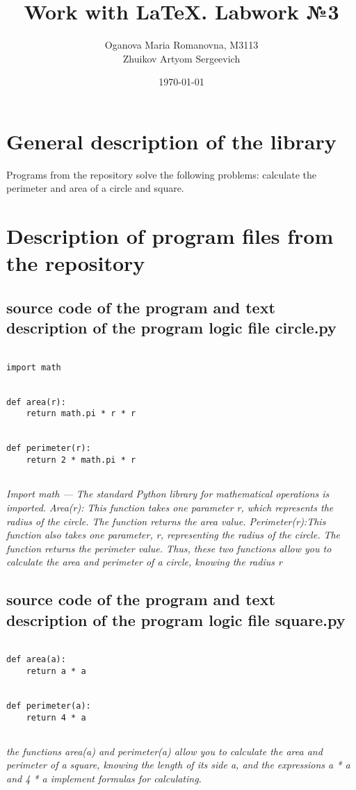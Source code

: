 \documentclass[12pt]{article}
\author{Oganova Maria Romanovna, M3113 \\
Zhuikov Artyom Sergeevich}
\date{\today}
\title{Work with LaTeX. Labwork №3}
\begin{document}
\maketitle

\newpage
\tableofcontents

\newpage

\section{General description of the library}
Programs from the repository solve the following problems: calculate the perimeter and area of a circle and square.

\section{Description of program files from the repository}

\subsection{source code of the program and text description of the program logic  file circle.py} 

\begin{verbatim}

import math


def area(r):
    return math.pi * r * r


def perimeter(r):
    return 2 * math.pi * r
    
\end{verbatim}
\textit{Import math — The standard Python library for mathematical operations is imported.
Area(r): This function takes one parameter r, which represents the radius of the circle. The function returns the area value.
Perimeter(r):This function also takes one parameter, r, representing the radius of the circle.  The function returns the perimeter value. Thus, these two functions allow you to calculate the area and perimeter of a circle, knowing the radius r}
 
\newpage
\subsection{source code of the program and text description of the program logic file square.py}

\begin{verbatim}

def area(a):
    return a * a


def perimeter(a):
    return 4 * a
    
\end{verbatim}
\textit{the functions area(a) and perimeter(a) allow you to calculate the area and perimeter of a square, knowing the length of its side a, and the expressions a * a and 4 * a implement formulas for calculating.}
\end{document}
